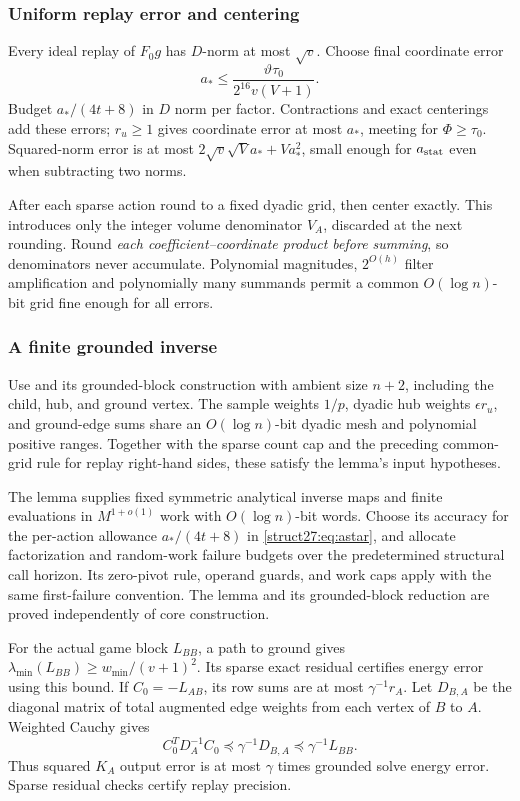 \documentclass[11pt]{article}
\theoremstyle{remark}
\begin{document}
\subsubsection{Uniform replay error and centering} Every ideal replay of $F_0g$
has $D$-norm at most $\sqrt v$.
Choose final coordinate error
\begin{equation}\label{struct27:eq:astar}
 a_*\le\frac{\vartheta\tau_0}{2^{16}v(V+1)}.
\end{equation}
Budget $a_* /(4t+8)$ in $D$ norm per factor.
Contractions and exact centerings add these errors; $r_u\ge1$ gives coordinate
error at most $a_*$, meeting  for $\Phi\ge\tau_0$.
Squared-norm error is at most $2\sqrt v\sqrt V a_*+Va_*^2$, small enough for
$a_{\rm stat}$ even when subtracting two norms.

After each sparse action round to a fixed dyadic grid, then center exactly.
This introduces only the integer volume denominator $V_A$, discarded at the next
rounding.
Round \emph{each coefficient--coordinate product before summing}, so
denominators never accumulate.
Polynomial magnitudes, $2^{O(h)}$ filter amplification and polynomially many
summands permit a common $O(\log n)$-bit grid fine enough for all errors.

\subsubsection{A finite grounded inverse} Use 
and its grounded-block construction with ambient size $n+2$, including the
child, hub, and ground vertex.
The sample weights $1/p$, dyadic hub weights $\epsilon r_u$, and ground-edge
sums share an $O(\log n)$-bit dyadic mesh and polynomial positive ranges.
Together with the sparse count cap and the preceding common-grid rule for replay
right-hand sides, these satisfy the lemma's input hypotheses.

The lemma supplies fixed symmetric analytical inverse maps and finite
evaluations in $M^{1+o(1)}$ work with $O(\log n)$-bit words.
Choose its accuracy for the per-action allowance $a_*/(4t+8)$ in
\eqref{struct27:eq:astar}, and allocate factorization and random-work failure
budgets over the predetermined structural call horizon.
Its zero-pivot rule, operand guards, and work caps apply with the same
first-failure convention.
The lemma and its grounded-block reduction are proved independently of core
construction.

For the actual game block $L_{BB}$, a path to ground gives
$\lambda_{\min}(L_{BB})\ge w_{\min}/(v+1)^2$.
Its sparse exact residual certifies energy error using this bound.
If $C_0=-L_{AB}$, its row sums are at most $\gamma^{-1}r_A$.
Let $D_{B,A}$ be the diagonal matrix of total augmented edge weights from each
vertex of $B$ to $A$.
Weighted Cauchy gives
\[
 C_0^TD_A^{-1}C_0\preceq\gamma^{-1}D_{B,A}
 \preceq\gamma^{-1}L_{BB}.
\]
Thus squared $K_A$ output error is at most $\gamma$ times grounded solve energy
error.
Sparse residual checks certify replay precision.
\end{document}
